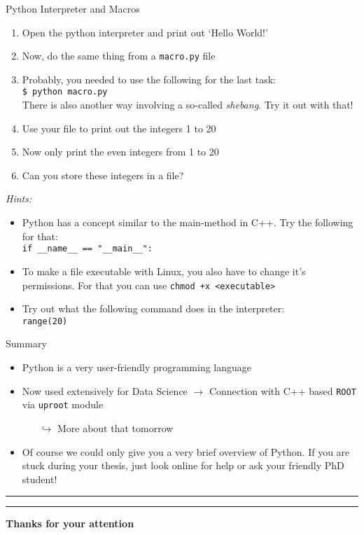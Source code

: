 \documentclass[10pt, aspectratio=169]{beamer}
\begin{document}
\begin{frame}{Python Interpreter and Macros}
\begin{enumerate}
  \item
    Open the python interpreter and print out `Hello World!'
  \item
    Now, do the same thing from a \texttt{macro.py} file
  \item
    Probably, you needed to use the following for the last task: \\
    \quad \texttt{\$  python macro.py} \\
    There is also another way involving a so-called \emph{shebang}. Try it out with that!
  \item
    Use your file to print out the integers 1 to 20
  \item
    Now only print the even integers from 1 to 20
  \item
    Can you store these integers in a file?
\end{enumerate}

\textit{Hints:}
\begin{itemize}
  \item
    Python has a concept similar to the main-method in C++. Try the following for that: \\
    \quad \texttt{if \_\_name\_\_ == "\_\_main\_\_":}
  \item
    To make a file executable with Linux, you also have to change it's permissions. For that you can use \texttt{chmod +x <executable>}
  \item
    Try out what the following command does in the interpreter: \\
    \quad \texttt{range(20)}
\end{itemize}

\end{frame}

\begin{frame}{Summary}
\begin{itemize}
  \item
    Python is a very user-friendly programming language
  \item
    Now used extensively for Data Science {\color{ugoelogodark}$\rightarrow$} Connection with C++ based \texttt{ROOT} via \texttt{uproot} module
    \begin{itemize}
      \item[$\hookrightarrow$]
        More about that tomorrow
    \end{itemize}
  \item
    Of course we could only give you a very brief overview of Python. If you are stuck during your thesis, just look online for help or ask your friendly PhD student!
\end{itemize}
\hrule height0pt
\vfill
\hrule height0pt
\begin{center}
  \textbf{\Large \color{ugoelogodark}Thanks for your attention}
\end{center}
\end{frame}

\end{document}
